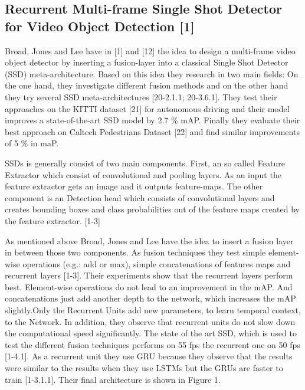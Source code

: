 \documentclass[conference]{IEEEtran}
\begin{document}
\subsection{Recurrent Multi-frame Single Shot Detector for Video Object Detection [1]}
Broad, Jones and Lee have in [1] and [12] the idea to design a multi-frame video object detector by inserting a fusion-layer into a classical Single Shot Detector (SSD) meta-architecture. Based on this idea they research in two main fields: On the one hand, they investigate different fusion methods and on the other hand they try several SSD meta-architectures [20-2.1.1; 20-3.6.1]. They test their approaches on the KITTI dataset [21] for autonomous driving and their model improves a state-of-the-art SSD model by 2.7 \% mAP. Finally they evaluate their best approach on Caltech Pedestrians Dataset [22] and find similar improvements of 5 \% in maP.   \newline

SSDs is generally consist of two main components. First, an so called Feature Extractor which consist of convolutional and pooling layers. As an input the feature extractor gets an image and it outputs feature-maps. The other component is an Detection head which consists of convolutional layers and creates bounding boxes and class probabilities out of the feature maps created by the feature extractor. [1-3] \newline

As mentioned above Broad, Jones and Lee have the idea to insert a fusion layer in between those two components. As fusion techniques they test simple element-wise operations (e.g.: add or max), simple concatenations of features maps and recurrent layers [1-3]. Their experiments show that the recurrent layers perform best. Element-wise operations do not lead to an improvement in the mAP. And concatenations just add another depth to the network, which increases the mAP slightly.Only the Recurrent Units add new parameters, to learn temporal context, to the Network. In addition, they observe that recurrent units do not slow down the computational speed significantly. The state of the art SSD, which is used to test the different fusion techniques performs on 55 fps the recurrent one on 50 fps [1-4.1]. As a recurrent unit they use GRU because they observe that the results were similar to the results when they use LSTMs but the GRUs are faster to train [1-3.1.1]. Their final architecture is shown in Figure 1.  \newline
\end{document}
